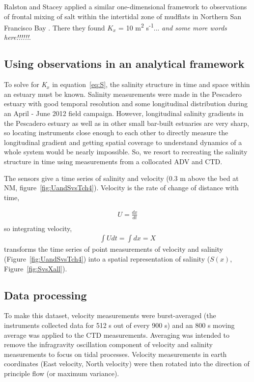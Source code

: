 Ralston and Stacey applied a similar one-dimensional framework to observations of frontal mixing of salt within the intertidal zone of mudflats in Northern San Francisco Bay \parencite*{Ralston:2005aa}. There they found $K_x$ = 10 m\textsuperscript{2} s\textsuperscript{-1}... \emph{and some more words here!!!!!!}. 

\subsection{Using observations in an analytical framework} \label{ssec:ObsInto1DAdvDiff}
To solve for \emph{K$_x$} in equation~\ref{eq:S}, the salinity structure in time and space within an estuary must be known. Salinity measurements were made in the Pescadero estuary with good temporal resolution and some longitudinal distribution during an April - June 2012 field campaign. However, longitudinal salinity gradients in the Pescadero estuary as well as in other small bar-built estuaries are very sharp, so locating instruments close enough to each other to directly measure the longitudinal gradient and getting spatial coverage to understand dynamics of a whole system would be nearly impossible. So, we resort to recreating the salinity structure in time using measurements from a collocated ADV and CTD. 

The sensors give a time series of salinity and velocity (0.3 m above the bed at NM, figure~\ref{fig:UandSvsTch4}). Velocity is the rate of change of distance with time,

\begin{eqnarray}
U = \frac{dx}{dt} \label{eq:uEdxdt}\\
\end{eqnarray}
so integrating velocity,
\begin{eqnarray}
\int{Udt} = \int{dx} = X \label{eq:intuEx}
\end{eqnarray}
transforms the time series of point measurements of velocity and salinity (Figure~\ref{fig:UandSvsTch4}) into a spatial representation of salinity ($S(x)$, Figure~\ref{fig:SvsXall}).

\subsection{Data processing} \label{ssec:DataProcessing}
To make this dataset, velocity measurements were burst-averaged (the instruments collected data for 512 s out of every 900 s) and an 800 s moving average was applied to the CTD measurements.  Averaging was intended to remove the infragravity oscillation component of velocity and salinity measurements to focus on tidal processes. Velocity measurements in earth coordinates (East velocity, North velocity) were then rotated into the direction of principle flow (or maximum variance). 

